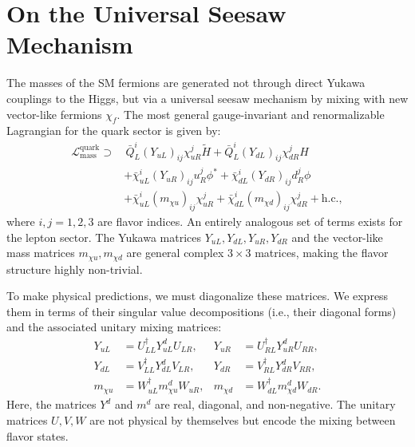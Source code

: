 \chapter{On the Universal Seesaw Mechanism}\label{app:universal_seesaw}

The masses of the SM fermions are generated not through direct Yukawa couplings to the Higgs, but via a universal seesaw mechanism by mixing with new vector-like fermions $\chi_f$. The most general gauge-invariant and renormalizable Lagrangian for the quark sector is given by:
\begin{align}
\mathcal{L}_{\text{mass}}^{\text{quark}} \supset & \, \bar{Q}_{L}^{i} (Y_{u L})_{ij} \chi_{u R}^{j} \tilde{H} + \bar{Q}_{L}^{i} (Y_{d L})_{ij} \chi_{d R}^{j} H \nonumber \\
& + \bar{\chi}_{u L}^{i} (Y_{u R})_{ij} u_{R}^{j} \phi^{*} + \bar{\chi}_{d L}^{i} (Y_{d R})_{ij} d_{R}^{j} \phi \nonumber \\
& + \bar{\chi}_{u L}^{i} (m_{\chi u})_{ij} \chi_{u R}^{j} + \bar{\chi}_{d L}^{i} (m_{\chi d})_{ij} \chi_{d R}^{j} + \text{h.c.}, \label{eq:L_Yuk_general_detail}
\end{align}
where $i, j = 1,2,3$ are flavor indices. An entirely analogous set of terms exists for the lepton sector. The Yukawa matrices $Y_{uL}, Y_{dL}, Y_{uR}, Y_{dR}$ and the vector-like mass matrices $m_{\chi u}, m_{\chi d}$ are general complex $3 \times 3$ matrices, making the flavor structure highly non-trivial.

To make physical predictions, we must diagonalize these matrices. We express them in terms of their singular value decompositions (i.e., their diagonal forms) and the associated unitary mixing matrices:
\begin{align*}
Y_{u L} &= U_{L L}^{\dagger} Y_{u L}^{d} U_{L R}, & Y_{u R} &= U_{R L}^{\dagger} Y_{u R}^{d} U_{R R}, \\
Y_{d L} &= V_{L L}^{\dagger} Y_{d L}^{d} V_{L R}, & Y_{d R} &= V_{R L}^{\dagger} Y_{d R}^{d} V_{R R}, \\
m_{\chi u} &= W_{u L}^{\dagger} m_{\chi u}^{d} W_{u R}, & m_{\chi d} &= W_{d L}^{\dagger} m_{\chi d}^{d} W_{d R}.
\end{align*}
Here, the matrices $Y^{d}$ and $m^{d}$ are real, diagonal, and non-negative. The unitary matrices $U, V, W$ are not physical by themselves but encode the mixing between flavor states.

